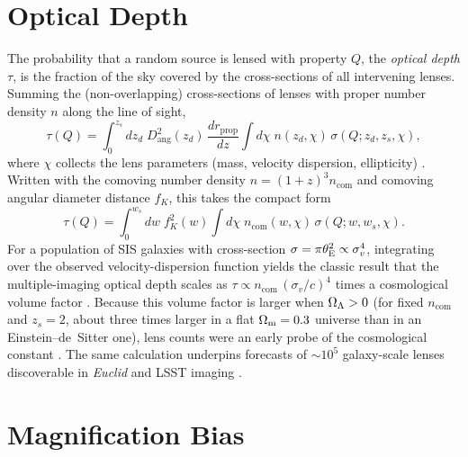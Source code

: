 \section{Optical Depth}
\label{sec:optical_depth}

The probability that a random source is lensed with property $Q$, the
\emph{optical depth} $\tau$, is the fraction of the sky covered by
the cross-sections of all intervening lenses.  Summing the (non-overlapping)
cross-sections of lenses with proper number density $n$ along the line of
sight,
\begin{equation}
    \tau(Q) = \int_0^{z_s}\! dz_d\;
        D_{\mathrm{ang}}^2(z_d)\,\frac{dr_{\mathrm{prop}}}{dz}
        \int d\chi\; n(z_d,\chi)\,\sigma(Q; z_d, z_s, \chi),
    \label{eq:optical_depth}
\end{equation}
where $\chi$ collects the lens parameters (mass, velocity dispersion,
ellipticity)
\citep[][Part~1, \S5.2]{schneider_kochanek_wambsganss_2006}.  Written with
the comoving number density $n = (1+z)^3 n_{\mathrm{com}}$ and comoving
angular diameter distance $f_K$, this takes the compact form
\begin{equation}
    \tau(Q) = \int_0^{w_s}\! dw\; f_K^2(w)
        \int d\chi\; n_{\mathrm{com}}(w,\chi)\,\sigma(Q; w, w_s, \chi).
    \label{eq:optical_depth_comoving}
\end{equation}
For a population of SIS galaxies with cross-section
$\sigma = \pi\theta_{\mathrm{E}}^2 \propto \sigma_v^4$, integrating over the observed
velocity-dispersion function yields the classic result that the
multiple-imaging optical depth scales as
$\tau \propto n_{\mathrm{com}}\,(\sigma_v/c)^4$ times a cosmological
volume factor \citep{turner_ostriker_gott_1984}.  Because this volume
factor is larger when $\Omega_{\Lambda} > 0$ (for fixed $n_{\mathrm{com}}$ and
$z_s = 2$, about three times larger in a flat $\Omega_{\mathrm{m}} = 0.3$ universe
than in an Einstein--de~Sitter one), lens counts were an early probe of
the cosmological constant
\citep[][Part~2, \S6]{schneider_kochanek_wambsganss_2006}.  The same
calculation underpins forecasts of $\sim 10^5$ galaxy-scale lenses
discoverable in \textit{Euclid} and LSST imaging \citep{collett_2015}.


\section{Magnification Bias}
\label{sec:magnification_bias}

